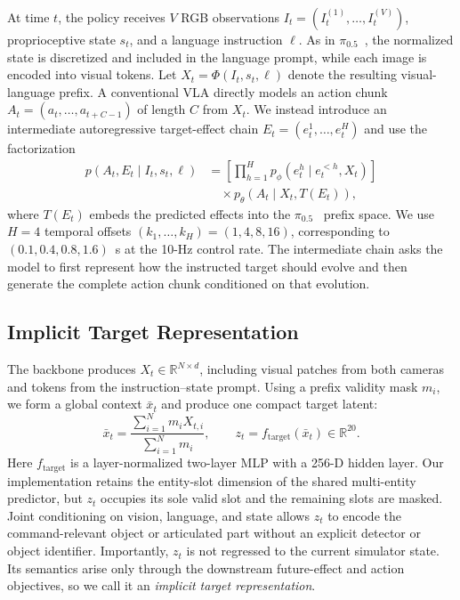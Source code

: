 \documentclass[letterpaper,10pt,conference]{ieeeconf}
\newcommand{\pihalf}{\ensuremath{\pi_{0.5}}}
\begin{document}
At time $t$, the policy receives $V$ RGB observations $I_t=(I_t^{(1)},\ldots,I_t^{(V)})$, proprioceptive state $s_t$, and a language instruction $\ell$.
As in \pihalf{}~\cite{pi05}, the normalized state is discretized and included in the language prompt, while each image is encoded into visual tokens.
Let $X_t=\Phi(I_t,s_t,\ell)$ denote the resulting visual-language prefix.
A conventional VLA directly models an action chunk $A_t=(a_t,\ldots,a_{t+C-1})$ of length $C$ from $X_t$.
We instead introduce an intermediate autoregressive target-effect chain $E_t=(e_t^1,\ldots,e_t^H)$ and use the factorization
\begin{align}
p(A_t,E_t\mid I_t,s_t,\ell)
&=\left[\prod_{h=1}^{H}p_{\phi}
  (e_t^h\mid e_t^{<h},X_t)\right] \nonumber\\
&\quad\times p_{\theta}(A_t\mid X_t,T(E_t)),
\label{eq:factorization}
\end{align}
where $T(E_t)$ embeds the predicted effects into the \pihalf{}~\cite{pi05} prefix space.
We use $H=4$ temporal offsets $(k_1,\ldots,k_H)=(1,4,8,16)$, corresponding to $(0.1,0.4,0.8,1.6)$~s at the 10-Hz control rate.
The intermediate chain asks the model to first represent how the instructed target should evolve and then generate the complete action chunk conditioned on that evolution.

\subsection{Implicit Target Representation}

The backbone produces $X_t\in\mathbb{R}^{N\times d}$, including visual patches from both cameras and tokens from the instruction--state prompt.
Using a prefix validity mask $m_i$, we form a global context $\bar x_t$ and produce one compact target latent:
\begin{equation}
\bar x_t=\frac{\sum_{i=1}^{N}m_iX_{t,i}}{\sum_{i=1}^{N}m_i},
\qquad z_t=f_{\mathrm{target}}(\bar x_t)\in\mathbb{R}^{20}.
\label{eq:target}
\end{equation}
Here $f_{\mathrm{target}}$ is a layer-normalized two-layer MLP with a 256-D hidden layer.
Our implementation retains the entity-slot dimension of the shared multi-entity predictor, but $z_t$ occupies its sole valid slot and the remaining slots are masked.
Joint conditioning on vision, language, and state allows $z_t$ to encode the command-relevant object or articulated part without an explicit detector or object identifier.
Importantly, $z_t$ is not regressed to the current simulator state.
Its semantics arise only through the downstream future-effect and action objectives, so we call it an \emph{implicit target representation}.
\end{document}
